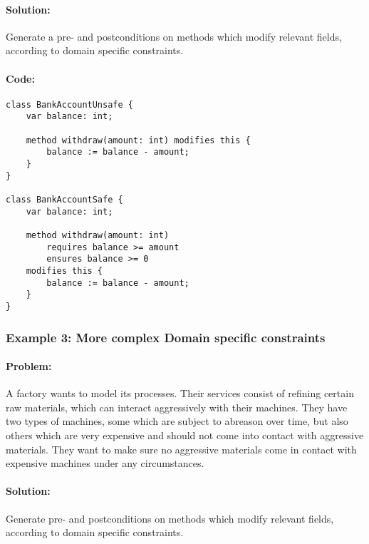 \paragraph{Solution:}
Generate a pre- and postconditions on methods which modify relevant fields, according to domain specific constraints.

\paragraph{Code:}
\begin{lstlisting}[language=dafny]
class BankAccountUnsafe {
	var balance: int;
	
	method withdraw(amount: int) modifies this {
		balance := balance - amount;
	}
}

class BankAccountSafe {
	var balance: int;
	
	method withdraw(amount: int) 
		requires balance >= amount  
		ensures balance >= 0  
	modifies this {
		balance := balance - amount;
	}
}
\end{lstlisting}


\subsubsection{Example 3: More complex Domain specific constraints} \label{Example 3}
\paragraph{Problem:}
A factory wants to model its processes. Their services consist of refining certain raw materials, which can interact aggressively with their machines. They have two types of machines, some which are subject to abreason over time, but also others which are very expensive and should not come into contact with aggressive materials. They want to make sure no aggressive materials come in contact with expensive machines under any circumstances.
\paragraph{Solution:}
Generate pre- and postconditions on methods which modify relevant fields, according to domain specific constraints.


